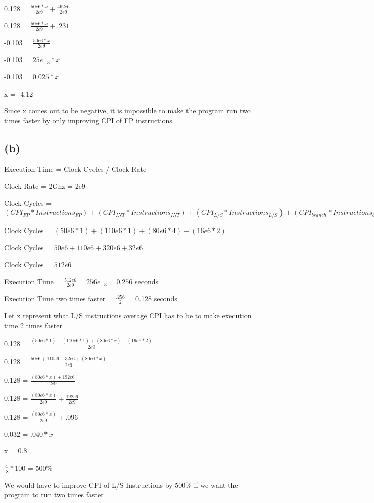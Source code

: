 \documentclass{article}
\begin{document}
    0.128 = $\frac{50e6*x}{2e9} + \frac{462e6}{2e9}$

    0.128 = $\frac{50e6*x}{2e9} + .231$

    -0.103 = $\frac{50e6*x}{2e9}$

    -0.103 = $25e_{-3} * x$

    -0.103 = $0.025 * x$

    x = -4.12

    Since x comes out to be negative, it is impossible to make the program run two times faster by only improving CPI of FP instructions

    \subsection*{(b)}

    Execution Time = Clock Cycles / Clock Rate

    Clock Rate = 2Ghz = 2e9

    Clock Cycles = $(CPI_{FP} * Instructions_{FP}) + (CPI_{INT} * Instructions_{INT}) + (CPI_{L/S} * Instructions_{L/S}) + (CPI_{branch}* Instructions_{branch})$

    Clock Cycles = $(50e6 * 1) + (110e6 * 1) + (80e6 * 4) + (16e6 * 2)$

    Clock Cycles = $50e6 + 110e6 + 320e6 + 32e6$

    Clock Cycles = $512e6$

    Execution Time = $\frac{512e6}{2e9} = 256e_{-3} = 0.256$ seconds

    Execution Time two times faster = $\frac{.256}{2}$ = 0.128 seconds

    Let x represent what L/S instructions average CPI has to be to make execution time 2 times faster

    0.128 = $\frac{(50e6 * 1) + (110e6 * 1) + (80e6 * x) + (16e6 * 2)}{2e9}$

    0.128 = $\frac{50e6 + 110e6 + 32e6 + (80e6 * x)}{2e9}$

    0.128 = $\frac{(80e6 * x) + 192e6}{2e9}$

    0.128 = $\frac{(80e6 * x)}{2e9} + \frac{192e6}{2e9}$

    0.128 = $\frac{(80e6 * x)}{2e9} + .096$

    0.032 = $.040 * x$

    x = 0.8

    $\frac{4}{.8} * 100$ = 500\%

    We would have to improve CPI of L/S Instructions by 500\% if we want the program to run two times faster
\end{document}
